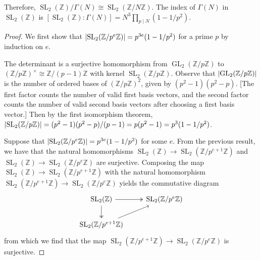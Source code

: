 \documentclass[10pt,leqno]{article}
\theoremstyle{plain}
\theoremstyle{definition}
\numberwithin{equation}{section}
\numberwithin{lem}{section}
\DeclareMathOperator{\GL}{GL}
\DeclareMathOperator{\SL}{SL}
\begin{document}
Therefore, $\SL_2(\mathbb{Z})/\varGamma(N)\cong \SL_2(\mathbb{Z}/N\mathbb{Z})$. The index of $\varGamma(N)$ in $\SL_2(\mathbb{Z})$ is $[\SL_2(\mathbb{Z}): \varGamma(N)] = N^3\prod_{p\mid N}(1-1/p^2)$.
\begin{proof}
    We first show that $\abs{\SL_2(\mathbb{Z}/p^e\mathbb{Z})} = p^{3e}(1-1/p^2)$ for a prime $p$ by induction on $e$.

    The determinant is a surjective homomorphism from $\GL_2(\mathbb{Z}/p\mathbb{Z})$ to $(\mathbb{Z}/p\mathbb{Z})^\times\cong \mathbb{Z}/(p-1)\mathbb{Z}$ with kernel $\SL_2(\mathbb{Z}/p\mathbb{Z})$. Observe that $\abs{\GL_2(\mathbb{Z}/p\mathbb{Z})}$ is the number of ordered bases of $(\mathbb{Z}/p\mathbb{Z})^2$, given by $(p^2-1)(p^2-p)$. [The first factor counts the number of valid first basis vectors, and the second factor counts the number of valid second basis vectors after choosing a first basis vector.] Then by the first isomorphism theorem, $\abs{\SL_2(\mathbb{Z}/p\mathbb{Z})} = (p^2-1)(p^2-p)/(p-1) = p(p^2-1) = p^3(1-1/p^2)$.
    
    Suppose that $\abs{\SL_2(\mathbb{Z}/p^e\mathbb{Z})} = p^{3e}(1-1/p^2)$ for some $e$. From the previous result, we have that the natural homomorphisms $\SL_2(\mathbb{Z})\to \SL_2(\mathbb{Z}/p^{e+1}\mathbb{Z})$ and $\SL_2(\mathbb{Z})\to \SL_2(\mathbb{Z}/p^e\mathbb{Z})$ are surjective. Composing the map $\SL_2(\mathbb{Z})\to \SL_2(\mathbb{Z}/p^{e+1}\mathbb{Z})$ with the natural homomorphism $\SL_2(\mathbb{Z}/p^{e+1}\mathbb{Z})\to \SL_2(\mathbb{Z}/p^e\mathbb{Z})$ yields the commutative diagram \[\begin{tikzcd}
        {\SL_2(\mathbb{Z})} & {\SL_2(\mathbb{Z}/p^e\mathbb{Z})} \\
        {\SL_2(\mathbb{Z}/p^{e+1}\mathbb{Z})}
        \arrow[from=2-1, to=1-2]
        \arrow[two heads, from=1-1, to=2-1]
        \arrow[two heads, from=1-1, to=1-2]
    \end{tikzcd}\] from which we find that the map $\SL_2(\mathbb{Z}/p^{e+1}\mathbb{Z})\to \SL_2(\mathbb{Z}/p^e\mathbb{Z})$ is surjective.


\end{proof}
\end{document}
